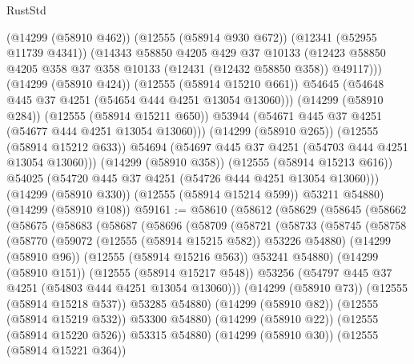 \begin{lexlean}{RustStd}
\begin{coremodule}
                (@14299 (@58910 @462))
                (@12555 (@58914 @930 @672))
                (@12341 (@52955 @11739 @4341))
                (@14343
                  @58850
                  @4205
                  @429
                  @37
                  @10133
                  (@12423 @58850 @4205 @358 @37 @358 @10133 (@12431 (@12432 @58850 @358)) @49117)))
              (@14299 (@58910 @424))
              (@12555 (@58914 @15210 @661))
              @54645
              (@54648 @445 @37 @4251 (@54654 @444 @4251 @13054 @13060)))
            (@14299 (@58910 @284))
            (@12555 (@58914 @15211 @650))
            @53944
            (@54671 @445 @37 @4251 (@54677 @444 @4251 @13054 @13060)))
          (@14299 (@58910 @265))
          (@12555 (@58914 @15212 @633))
          @54694
          (@54697 @445 @37 @4251 (@54703 @444 @4251 @13054 @13060)))
        (@14299 (@58910 @358))
        (@12555 (@58914 @15213 @616))
        @54025
        (@54720 @445 @37 @4251 (@54726 @444 @4251 @13054 @13060)))
      (@14299 (@58910 @330))
      (@12555 (@58914 @15214 @599))
      @53211
      @54880)
    (@14299 (@58910 @108))
@59161 := @58610
    (@58612
      (@58629
        (@58645
          (@58662
            (@58675
              (@58683
                (@58687
                  (@58696
                    (@58709
                      (@58721
                        (@58733
                          (@58745
                            (@58758
                              (@58770
                                (@59072 (@12555 (@58914 @15215 @582)) @53226 @54880)
                                (@14299 (@58910 @96))
                                (@12555 (@58914 @15216 @563))
                                @53241
                                @54880)
                              (@14299 (@58910 @151))
                              (@12555 (@58914 @15217 @548))
                              @53256
                              (@54797 @445 @37 @4251 (@54803 @444 @4251 @13054 @13060)))
                            (@14299 (@58910 @73))
                            (@12555 (@58914 @15218 @537))
                            @53285
                            @54880)
                          (@14299 (@58910 @82))
                          (@12555 (@58914 @15219 @532))
                          @53300
                          @54880)
                        (@14299 (@58910 @22))
                        (@12555 (@58914 @15220 @526))
                        @53315
                        @54880)
                      (@14299 (@58910 @30))
                      (@12555 (@58914 @15221 @364))

\end{coremodule}
\end{lexlean}

